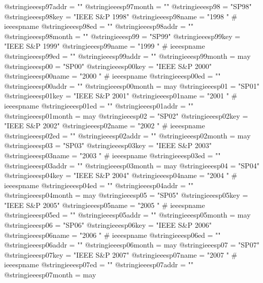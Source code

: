 @string{ieeesp97addr =          ""}
@string{ieeesp97month =         ""}
@string{ieeesp98 =              "SP98"}
@string{ieeesp98key =           "IEEE S\&P 1998"}
@string{ieeesp98name =          "1998 " # ieeespname}
@string{ieeesp98ed =            ""}
@string{ieeesp98addr =          ""}
@string{ieeesp98month =         ""}
@string{ieeesp99 =              "SP99"}
@string{ieeesp99key =           "IEEE S\&P 1999"}
@string{ieeesp99name =          "1999 " # ieeespname}
@string{ieeesp99ed =            ""}
@string{ieeesp99addr =          ""}
@string{ieeesp99month =         may}
@string{ieeesp00 =              "SP00"}
@string{ieeesp00key =           "IEEE S\&P 2000"}
@string{ieeesp00name =          "2000 " # ieeespname}
@string{ieeesp00ed =            ""}
@string{ieeesp00addr =          ""}
@string{ieeesp00month =         may}
@string{ieeesp01 =              "SP01"}
@string{ieeesp01key =           "IEEE S\&P 2001"}
@string{ieeesp01name =          "2001 " # ieeespname}
@string{ieeesp01ed =            ""}
@string{ieeesp01addr =          ""}
@string{ieeesp01month =         may}
@string{ieeesp02 =              "SP02"}
@string{ieeesp02key =           "IEEE S\&P 2002"}
@string{ieeesp02name =          "2002 " # ieeespname}
@string{ieeesp02ed =            ""}
@string{ieeesp02addr =          ""}
@string{ieeesp02month =         may}
@string{ieeesp03 =              "SP03"}
@string{ieeesp03key =           "IEEE S\&P 2003"}
@string{ieeesp03name =          "2003 " # ieeespname}
@string{ieeesp03ed =            ""}
@string{ieeesp03addr =          ""}
@string{ieeesp03month =         may}
@string{ieeesp04 =              "SP04"}
@string{ieeesp04key =           "IEEE S\&P 2004"}
@string{ieeesp04name =          "2004 " # ieeespname}
@string{ieeesp04ed =            ""}
@string{ieeesp04addr =          ""}
@string{ieeesp04month =         may}
@string{ieeesp05 =              "SP05"}
@string{ieeesp05key =           "IEEE S\&P 2005"}
@string{ieeesp05name =          "2005 " # ieeespname}
@string{ieeesp05ed =            ""}
@string{ieeesp05addr =          ""}
@string{ieeesp05month =         may}
@string{ieeesp06 =              "SP06"}
@string{ieeesp06key =           "IEEE S\&P 2006"}
@string{ieeesp06name =          "2006 " # ieeespname}
@string{ieeesp06ed =            ""}
@string{ieeesp06addr =          ""}
@string{ieeesp06month =         may}
@string{ieeesp07 =              "SP07"}
@string{ieeesp07key =           "IEEE S\&P 2007"}
@string{ieeesp07name =          "2007 " # ieeespname}
@string{ieeesp07ed =            ""}
@string{ieeesp07addr =          ""}
@string{ieeesp07month =         may}
